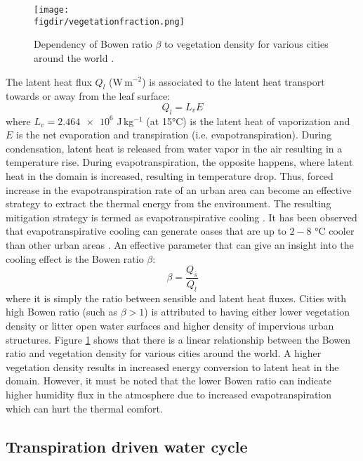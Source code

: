 \begin{figure}[p]
	\centering
	\texttt{[image: \\figdir/vegetationfraction.png]}
	\caption{Dependency of Bowen ratio $\beta$ to vegetation density for various cities around the world \citep{Oke2017a}. }
	\label{fig:vegetationfraction}
\end{figure}	

The latent heat flux $Q_l$ (W\,m$^{-2}$) is associated to the latent heat transport towards or away from the leaf surface:
\begin{equation}
Q_l = L_v E
\end{equation}
where $L_v=\num{2.464e6}$ J\,kg$^{-1}$ (at 15\si{\celsius}) is the latent heat of vaporization and $E$ is the net evaporation and transpiration (i.e. evapotranspiration). During condensation, latent heat is released from water vapor in the air resulting in a temperature rise. During evapotranspiration, the opposite happens, where latent heat in the domain is increased, resulting in temperature drop. Thus, forced increase in the evapotranspiration rate of an urban area can become an effective strategy to extract the thermal energy from the environment. The resulting mitigation strategy is termed as evapotranspirative cooling \citep{Taha1997}. It has been observed that evapotranspirative cooling can generate oases that are up to $2-8$ \si{\celsius} cooler than other urban areas \citep{Oke1989,Taha1991}. An effective parameter that can give an insight into the cooling effect is the Bowen ratio $\beta$:
\begin{equation}
\beta = \frac{Q_s}{Q_l}
\end{equation}
where it is simply the ratio between sensible and latent heat fluxes. Cities with high Bowen ratio (such as $\beta > 1$) is attributed to having either lower vegetation density or litter open water surfaces and higher density of impervious urban structures. Figure \ref{fig:vegetationfraction} shows that there is a linear relationship between the Bowen ratio and vegetation density for various cities around the world. A higher vegetation density results in increased energy conversion to latent heat in the domain. However, it must be noted that the lower Bowen ratio can indicate higher humidity flux in the atmosphere due to increased evapotranspiration which can hurt the thermal comfort.

\subsection{Transpiration driven water cycle}

